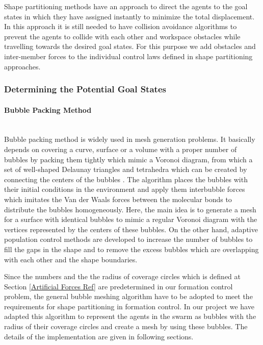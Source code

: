 Shape partitioning methods have an approach to direct the agents to the goal states in which they have assigned instantly to minimize the total displacement. In this approach it is still needed to have collision avoidance algorithms to prevent the agents to collide with each other and workspace obstacles while travelling towards the desired goal states. For this purpose we add obstacles and inter-member forces to the individual control laws defined in shape partitioning approaches.
			
\subsubsection{Determining the Potential Goal States} \label{Partitioning_ref}
\paragraph{Bubble Packing Method} \hspace{0pt} \\				
Bubble packing method is widely used in mesh generation problems. It basically depends on covering a curve, surface or a volume with a proper number of bubbles by packing them tightly which mimic a Voronoi diagram, from which a set of well-shaped Delaunay triangles and tetrahedra which can be created by connecting the centers of the bubbles \cite{27}.  The algorithm places the bubbles with their initial conditions in the environment and apply them interbubble forces which imitates the Van der Waals forces between the molecular bonds  to distribute the bubbles homogeneously. Here, the main idea is to generate a mesh for a surface with identical bubbles to mimic a regular Voronoi diagram with the vertices represented by the centers of these bubbles. On the other hand, adaptive population control  methods are developed to increase the number of bubbles to fill the gaps in the shape and to remove the excess bubbles which are overlapping with each other and the shape boundaries. 

Since the numbers and the the radius of coverage circles which is defined at Section \ref{Artificial Forces Ref} are predetermined in our formation control problem, the general bubble meshing algorithm have to be adopted to meet the requirements for shape partitioning in formation control.  In our project we have adapted this algorithm to represent the agents in the swarm as bubbles with the radius of their coverage circles and create a mesh by using these bubbles. The details of the implementation are given in following sections.\newline
			
